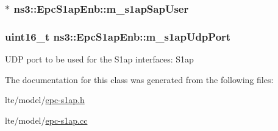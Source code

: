 \subsubsection[{\texorpdfstring{m\+\_\+s1ap\+Sap\+User}{m_s1apSapUser}}]{$\ast$ ns3\+::\+Epc\+S1ap\+Enb\+::m\+\_\+s1ap\+Sap\+User\hspace{0.3cm}{\ttfamily [protected]}}\hypertarget{classns3_1_1EpcS1apEnb_a6905f0d78d5d39dd5f6d521ec9615713}{}\label{classns3_1_1EpcS1apEnb_a6905f0d78d5d39dd5f6d521ec9615713}
\subsubsection[{\texorpdfstring{m\+\_\+s1ap\+Udp\+Port}{m_s1apUdpPort}}]{\setlength{\rightskip}{0pt plus 5cm}uint16\+\_\+t ns3\+::\+Epc\+S1ap\+Enb\+::m\+\_\+s1ap\+Udp\+Port\hspace{0.3cm}{\ttfamily [private]}}\hypertarget{classns3_1_1EpcS1apEnb_ae06c681ae6a91dc4729408d0a7b4dd39}{}\label{classns3_1_1EpcS1apEnb_ae06c681ae6a91dc4729408d0a7b4dd39}
U\+DP port to be used for the S1ap interfaces\+: S1ap 

The documentation for this class was generated from the following files\+:\begin{DoxyCompactItemize}
\item 
lte/model/\hyperlink{epc-s1ap_8h}{epc-\/s1ap.\+h}\item 
lte/model/\hyperlink{epc-s1ap_8cc}{epc-\/s1ap.\+cc}\end{DoxyCompactItemize}

